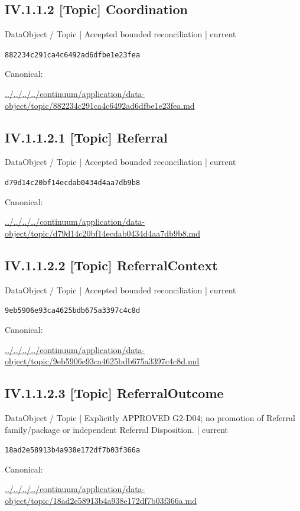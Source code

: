 \documentclass[10pt,a4paper]{article}
\begin{document}
\subsection*{IV.1.1.2 [Topic] Coordination}
{\small DataObject / Topic | Accepted bounded reconciliation | current}\par
\texttt{882234c291ca4c6492ad6dfbe1e23fea}\par
Canonical: \par
{\footnotesize\url{../../../../continuum/application/data-object/topic/882234c291ca4c6492ad6dfbe1e23fea.md}}\par
\subsection*{IV.1.1.2.1 [Topic] Referral}
{\small DataObject / Topic | Accepted bounded reconciliation | current}\par
\texttt{d79d14c20bf14ecdab0434d4aa7db9b8}\par
Canonical: \par
{\footnotesize\url{../../../../continuum/application/data-object/topic/d79d14c20bf14ecdab0434d4aa7db9b8.md}}\par
\subsection*{IV.1.1.2.2 [Topic] ReferralContext}
{\small DataObject / Topic | Accepted bounded reconciliation | current}\par
\texttt{9eb5906e93ca4625bdb675a3397c4c8d}\par
Canonical: \par
{\footnotesize\url{../../../../continuum/application/data-object/topic/9eb5906e93ca4625bdb675a3397c4c8d.md}}\par
\subsection*{IV.1.1.2.3 [Topic] ReferralOutcome}
{\small DataObject / Topic | Explicitly APPROVED G2-D04; no promotion of Referral family/package or independent Referral Disposition. | current}\par
\texttt{18ad2e58913b4a938e172df7b03f366a}\par
Canonical: \par
{\footnotesize\url{../../../../continuum/application/data-object/topic/18ad2e58913b4a938e172df7b03f366a.md}}\par
\end{document}
